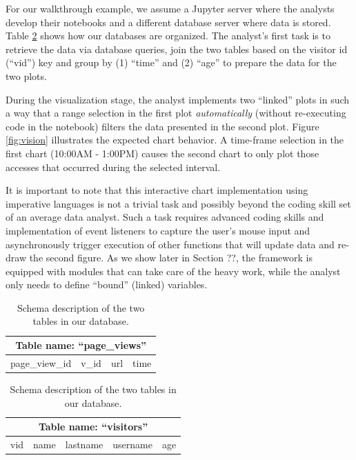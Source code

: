 For our walkthrough example, we assume a Jupyter server where the analysts develop their notebooks and a different database server where data is stored. Table \ref{tab:schema} shows how our databases are organized. The analyst's first task is to retrieve the data via database queries, join the two tables based on the visitor id (``vid'') key and group by (1) ``time'' and (2) ``age'' to prepare the data for the two plots.

During the visualization stage, the analyst implements two ``linked'' plots in such a way that a range selection in the first plot \textit{automatically} (without re-executing code in the notebook) filters the data presented in the second plot. Figure \ref{fig:vision} illustrates the expected chart behavior. A time-frame selection in the first chart (10:00AM - 1:00PM) causes the second chart to only plot those accesses that occurred during the selected interval. 

It is important to note that this interactive chart implementation using imperative languages is not a trivial task and possibly beyond the coding skill set of an average data analyst. Such a task requires advanced coding skills and implementation of event listeners to capture the user's mouse input and asynchronously trigger execution of other functions that will update data and re-draw the second figure. As we show later in Section ??, the {\projname} framework is equipped with modules that can take care of the heavy work, while the analyst only needs to define ``bound'' (linked) variables.

\begin{table}
\begin{center}

\begin{tabular}{|c|c|c|c|}
\hline 
\multicolumn{4}{|c|}{Table name: ``page\_views''} \\ 
\hline 
page\_view\_id & v\_id & url & time \\ 
\hline 
\end{tabular} 

\hfill

\begin{tabular}{|c|c|c|c|c|}
\hline 
\multicolumn{5}{|c|}{Table name: ``visitors''} \\ 
\hline 
vid & name & lastname & username & age \\ 
\hline 
\end{tabular} 

\end{center}
\caption{Schema description of the two tables in our database.}
\label{tab:schema}
\end{table}

